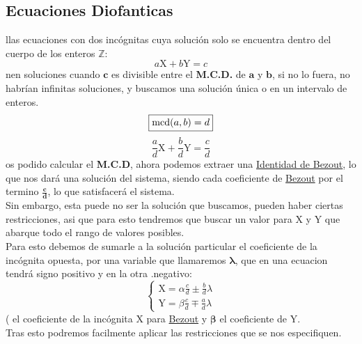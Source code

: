 \subsection{Ecuaciones Diofanticas}
llas ecuaciones con dos incógnitas cuya solución solo se encuentra dentro del cuerpo de los enteros \(\mathbf{\mathbb{Z}}\):
\[
        \boxed{a\mathrm{X} + b\mathrm{Y} = c}
\]
nen soluciones cuando \(\mathbf{c}\) es divisible entre el \textbf{M.C.D.} de \(\mathbf{a}\) y \(\mathbf{b}\), si no lo fuera, no habrían infinitas soluciones, y buscamos una solución única o en un intervalo de enteros.
\[
        \boxed{\textnormal{mcd}(a,b) = d}
\]
\[
        \boxed{\frac{a}{d}\mathrm{X} + \frac{b}{d}\mathrm{Y} = \frac{c}{d}}
\]
os podido calcular el \textbf{M.C.D}, ahora podemos extraer una \underline{Identidad de Bezout}, lo que nos dará una solución del sistema, siendo cada coeficiente de \underline{Bezout} por el termino \(\mathbf{\frac{c}{d}}\), lo que satisfacerá el sistema.\\ Sin embargo, esta puede no ser la solución que buscamos, pueden haber ciertas restricciones, asi que para esto tendremos que buscar un valor para \(\mathbf{\mathrm{X}}\) y \(\mathbf{\mathrm{Y}}\) que abarque todo el rango de valores posibles. \\ Para esto debemos de sumarle a la solución particular el coeficiente de la incógnita opuesta, por una variable que llamaremos \(\mathbf{\lambda}\), que en una ecuacion tendrá signo positivo y en la otra .negativo:
\[
        \boxed{\begin{cases}
                        \mathrm{X} = \alpha \frac{c}{d} \pm \frac{b}{d}\lambda \\
                        \mathrm{Y} = \beta \frac{c}{d}\mp \frac{a}{d}\lambda
                \end{cases}}
\]
(\mathbf{\alpha}\) el coeficiente de la incógnita \(\mathbf{\mathrm{X}}\) para \underline{Bezout} y \(\mathbf{\beta}\) el coeficiente de \(\mathbf{\mathrm{Y}}\).\\ Tras esto podremos facilmente aplicar las restricciones que se nos especifiquen.
